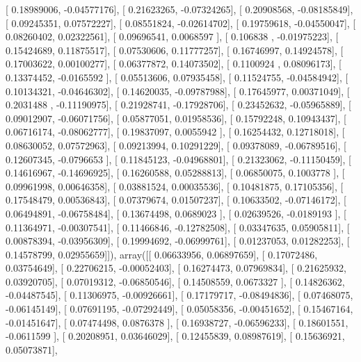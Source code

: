 \documentclass{article}
\begin{document}
       [ 0.18989006, -0.04577176],
       [ 0.21623265, -0.07324265],
       [ 0.20908568, -0.08185849],
       [ 0.09245351,  0.07572227],
       [ 0.08551824, -0.02614702],
       [ 0.19759618, -0.04550047],
       [ 0.08260402,  0.02322561],
       [ 0.09696541,  0.0068597 ],
       [ 0.106838  , -0.01975223],
       [ 0.15424689,  0.11875517],
       [ 0.07530606,  0.11777257],
       [ 0.16746997,  0.14924578],
       [ 0.17003622,  0.00100277],
       [ 0.06377872,  0.14073502],
       [ 0.1100924 ,  0.08096173],
       [ 0.13374452, -0.0165592 ],
       [ 0.05513606,  0.07935458],
       [ 0.11524755, -0.04584942],
       [ 0.10134321, -0.04646302],
       [ 0.14620035, -0.09787988],
       [ 0.17645977,  0.00371049],
       [ 0.2031488 , -0.11190975],
       [ 0.21928741, -0.17928706],
       [ 0.23452632, -0.05965889],
       [ 0.09012907, -0.06071756],
       [ 0.05877051,  0.01958536],
       [ 0.15792248,  0.10943437],
       [ 0.06716174, -0.08062777],
       [ 0.19837097,  0.0055942 ],
       [ 0.16254432,  0.12718018],
       [ 0.08630052,  0.07572963],
       [ 0.09213994,  0.10291229],
       [ 0.09378089, -0.06789516],
       [ 0.12607345, -0.0796653 ],
       [ 0.11845123, -0.04968801],
       [ 0.21323062, -0.11150459],
       [ 0.14616967, -0.14696925],
       [ 0.16260588,  0.05288813],
       [ 0.06850075,  0.1003778 ],
       [ 0.09961998,  0.00646358],
       [ 0.03881524,  0.00035536],
       [ 0.10481875,  0.17105356],
       [ 0.17548479,  0.00536843],
       [ 0.07379674,  0.01507237],
       [ 0.10633502, -0.07146172],
       [ 0.06494891, -0.06758484],
       [ 0.13674498,  0.0689023 ],
       [ 0.02639526, -0.0189193 ],
       [ 0.11364971, -0.00307541],
       [ 0.11466846, -0.12782508],
       [ 0.03347635,  0.05905811],
       [ 0.00878394, -0.03956309],
       [ 0.19994692, -0.06999761],
       [ 0.01237053,  0.01282253],
       [ 0.14578799,  0.02955659]]), array([[ 0.06633956,  0.06897659],
       [ 0.17072486,  0.03754649],
       [ 0.22706215, -0.00052403],
       [ 0.16274473,  0.07969834],
       [ 0.21625932,  0.03920705],
       [ 0.07019312, -0.06850546],
       [ 0.14508559,  0.0673327 ],
       [ 0.14826362, -0.04487545],
       [ 0.11306975, -0.00926661],
       [ 0.17179717, -0.08494836],
       [ 0.07468075, -0.06145149],
       [ 0.07691195, -0.07292449],
       [ 0.05058356, -0.00451652],
       [ 0.15467164, -0.01451647],
       [ 0.07474498,  0.0876378 ],
       [ 0.16938727, -0.06596233],
       [ 0.18601551, -0.0611599 ],
       [ 0.20208951,  0.03646029],
       [ 0.12455839,  0.08987619],
       [ 0.15636921,  0.05073871],
\end{document}
